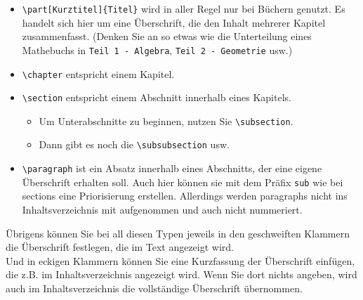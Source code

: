 \begin{itemize}
	\item \verb|\part[Kurztitel]{Titel}| wird in aller Regel nur bei Büchern genutzt. Es handelt sich hier um eine Überschrift, die den Inhalt mehrerer Kapitel zusammenfasst. (Denken Sie an so etwas wie die Unterteilung eines Mathebuchs in \verb|Teil 1 - Algebra|, \verb|Teil 2 - Geometrie| usw.)
	\item \verb|\chapter| entspricht einem Kapitel.
	\item \verb|\section| entspricht einem Abschnitt innerhalb eines Kapitels.
	\begin{itemize}
		\item Um Unterabschnitte zu beginnen, nutzen Sie \verb|\subsection|.
		\item Dann gibt es noch die \verb|\subsubsection| usw.
	\end{itemize}
	\item \verb|\paragraph| ist ein Absatz innerhalb eines Abschnitts, der eine eigene Überschrift erhalten soll. Auch hier können sie mit dem Präfix \verb|sub| wie bei sections eine Priorisierung erstellen. Allerdings werden paragraphs nicht ins Inhaltsverzeichnis mit aufgenommen und auch nicht nummeriert.
\end{itemize}

Übrigens können Sie bei all diesen Typen jeweils in den geschweiften Klammern die Überschrift festlegen, die im Text angezeigt wird.\\

Und in eckigen Klammern können Sie eine Kurzfassung der Überschrift einfügen, die z.B. im Inhaltsverzeichnis angezeigt wird. Wenn Sie dort nichts angeben, wird auch im Inhaltsverzeichnis die vollständige Überschrift übernommen.

